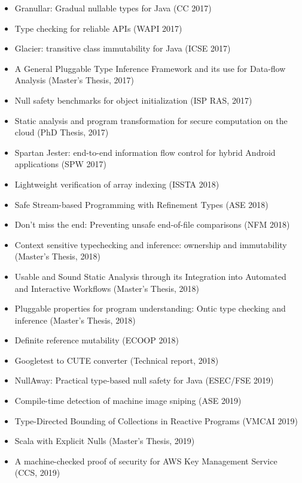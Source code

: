 \begin{itemize}
\item
  Granullar: Gradual nullable types for {Java} (CC 2017)~\cite{BrotherstonDL2017}
\item
  Type checking for reliable APIs (WAPI 2017)~\cite{KechagiaS2017}
\item
  Glacier: transitive class immutability for Java (ICSE 2017)~\cite{CoblenzNAMS2017}
\item
  A General Pluggable Type Inference Framework and its use for Data-flow
  Analysis (Master's Thesis, 2017)~\cite{Li2017}
\item
  Null safety benchmarks for object initialization (ISP RAS, 2017)~\cite{Kogtenkov2017}
\item
  Static analysis and program transformation for secure computation on the
  cloud (PhD Thesis, 2017)~\cite{Dong2017}
\item
  Spartan Jester: end-to-end information flow control for hybrid Android
  applications (SPW 2017)~\cite{SextonCN2017}


\item
  Lightweight verification of array indexing (ISSTA 2018)~\cite{KelloggDME2018}
\item
  Safe Stream-based Programming with Refinement Types (ASE 2018)~\cite{SteinCSC2018}
\item
  Don't miss the end: Preventing unsafe end-of-file comparisons (NFM 2018)~\cite{ChenD2018}
\item
  Context sensitive typechecking and inference: ownership and immutability
  (Master's Thesis, 2018)~\cite{Ta2018}
\item
  Usable and Sound Static Analysis through its Integration into Automated
  and Interactive Workflows (Master's Thesis, 2018)~\cite{Valgma2018}
\item
  Pluggable properties for program understanding: Ontic type checking and
  inference (Master's Thesis, 2018)~\cite{Chen2018}
\item
  Definite reference mutability (ECOOP 2018)~\cite{Milanova2018}
\item
  Googletest to CUTE converter (Technical report, 2018)~\cite{GschwindV2018}


\item
  NullAway: Practical type-based null safety for Java (ESEC/FSE 2019)~\cite{BanerjeeCS2019}
\item
  Compile-time detection of machine image sniping (ASE 2019)~\cite{Kellogg2019}
\item
  Type-Directed Bounding of Collections in Reactive Programs (VMCAI 2019)~\cite{LuCCT2019}
\item
  Scala with Explicit Nulls (Master's Thesis, 2019)~\cite{NietoRodriguez2019}
\item
  A machine-checked proof of security for AWS Key Management Service (CCS, 2019)~\cite{AlmeidaBBCCGPPST2019}


\end{itemize}
